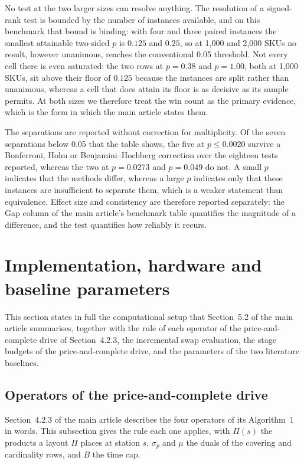 \documentclass[11pt]{article}
\begin{document}
No test at the two larger sizes can resolve anything. The resolution of a signed-rank test is
bounded by the number of instances available, and on this benchmark that bound is binding: with
four and three paired instances the smallest attainable two-sided $p$ is $0.125$ and $0.25$, so
at 1{,}000 and 2{,}000 SKUs no result, however unanimous, reaches the conventional 0.05
threshold. Not every cell there is even saturated: the two rows at $p=0.38$ and $p=1.00$, both
at 1{,}000 SKUs, sit above their floor of $0.125$ because the instances are split rather than
unanimous, whereas a cell that does attain its floor is as decisive as its sample permits. At
both sizes we therefore treat the win count as the primary evidence, which is the form in which
the main article states them.

The separations are reported without correction for multiplicity. Of the seven separations
below 0.05 that the table shows, the five at $p \le 0.0020$ survive a Bonferroni, Holm or
Benjamini--Hochberg correction over the eighteen tests reported, whereas the two at
$p = 0.0273$ and $p = 0.049$ do not. A small $p$ indicates that the methods differ, whereas a
large $p$ indicates only that these instances are insufficient to separate them, which is a
weaker statement than equivalence. Effect size and consistency are therefore reported
separately: the Gap column of the main article's benchmark table quantifies the magnitude of a
difference, and the test quantifies how reliably it recurs.

\section{Implementation, hardware and baseline parameters}\label{sup:impl}
This section states in full the computational setup that Section~5.2 of the main article
summarises, together with the rule of each operator of the price-and-complete drive of Section~4.2.3, the incremental swap evaluation, the stage budgets of
the price-and-complete drive, and the parameters of the two literature baselines.

\subsection{Operators of the price-and-complete drive}\label{sup:cgops}
Section~4.2.3 of the main article describes the four operators of its Algorithm~1 in words. This
subsection gives the rule each one applies, with $\Pi(s)$ the products a layout $\Pi$ places at
station $s$, $\sigma_p$ and $\mu$ the duals of the covering and cardinality rows, and $B$ the time
cap.
\end{document}

